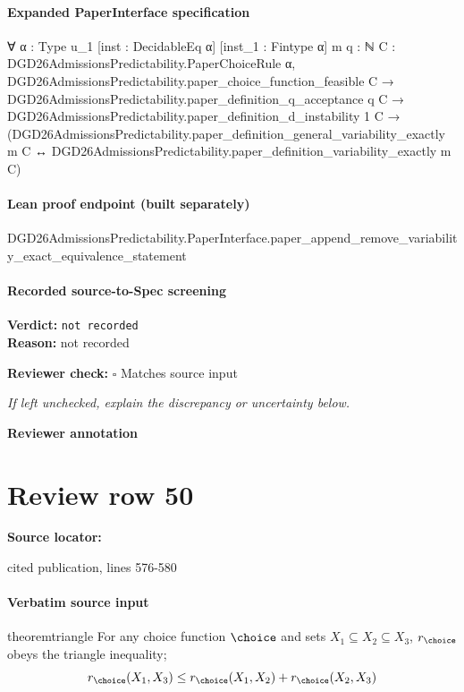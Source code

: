 \documentclass[10pt]{article}
\newcommand{\reviewerbox}{%
  \par\noindent\fbox{\parbox{0.96\linewidth}{\rule{0pt}{0.38in}}}\par
}
\newcommand{\reviewmatch}[1]{%
  \par\noindent\textbf{Reviewer check:} $\square$\; #1\par
  \noindent\emph{If left unchecked, explain the discrepancy or uncertainty below.}\par
}
\begin{document}
\paragraph{Expanded PaperInterface specification}
\begin{ReviewVerbatim}
∀ {α : Type u_1} [inst : DecidableEq α] [inst_1 : Fintype α] {m q : ℕ}
  {C : DGD26AdmissionsPredictability.PaperChoiceRule α},
  DGD26AdmissionsPredictability.paper_choice_function_feasible C →
    DGD26AdmissionsPredictability.paper_definition_q_acceptance q C →
      DGD26AdmissionsPredictability.paper_definition_d_instability 1 C →
        (DGD26AdmissionsPredictability.paper_definition_general_variability_exactly m C ↔
          DGD26AdmissionsPredictability.paper_definition_variability_exactly m C)
\end{ReviewVerbatim}

\paragraph{Lean proof endpoint (built separately)}\begin{ReviewVerbatim}
DGD26AdmissionsPredictability.PaperInterface.paper_append_remove_variability_exact_equivalence_statement
\end{ReviewVerbatim}

\paragraph{Recorded source-to-Spec screening}
\textbf{Verdict:} \texttt{not recorded}
\\
\textbf{Reason:} not recorded
\reviewmatch{Matches source input}
\noindent\textbf{Reviewer annotation}\par
\reviewerbox
\clearpage
\hypertarget{source-claim-e1e0f5f892109672}{}
\section*{Review row 50}
\textbf{Source locator:} {\footnotesize\raggedright cited publication, lines 576-\allowbreak{}580\par}
\paragraph{Verbatim source input}
\begin{ReviewVerbatim}
\begin{restatable}{theorem}{triangle}
\label{thm:triangle-ineq}
For any choice function $\choice$ and sets $X_1 \subseteq X_2 \subseteq X_3$, $r_\choice$ obeys the triangle inequality;
$$r_\choice(X_1, X_3) \leq r_\choice(X_1, X_2) + r_\choice(X_2, X_3)$$
\end{restatable}
\end{ReviewVerbatim}
\end{document}
